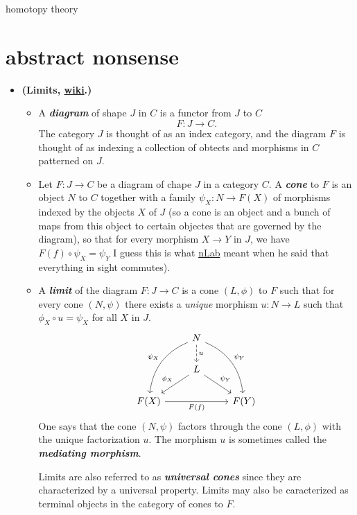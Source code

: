 \documentclass{article}
\begin{document}
{\Huge homotopy theory}
\tableofcontents
\section{abstract nonsense}
\begin{defn}\leavevmode
	\begin{itemize}
		\item \textbf{(Limits, \href{https://en.wikipedia.org/wiki/Limit_(category_theory)}{wiki}.)}
		\begin{itemize}
			\item A \textbf{\textit{diagram}} of shape $J$ in $C$ is a functor from $J$ to $C$
			\[F:J\to C.\]
			The category $J$ is thought of as an index category, and the diagram $F$ is thought of as indexing a collection of obtects and morphisms in $C$ patterned on $J$.
			
			\item Let $F:J\to C$ be a diagram of chape $J$ in a category $C$. A \textbf{\textit{cone}} to $F$ is an object $N$ to $C$ together with a family $\psi_X:N\to F(X)$ of morphisms indexed by the objects $X$ of $J$ {\color{persiangreen}(so a cone is an object and a bunch of maps from this object to certain objectes that are governed by the diagram)}, so that for every morphism $X\to Y$ in $J$, we have $F(f)\circ\psi_X=\psi_Y$ {\color{persiangreen} I guess this is what \href{https://ncatlab.org/nlab/show/limit}{nLab} meant when he said that everything in sight commutes)}.
			
			\item A \textbf{\textit{limit}} of the diagram $F:J\to C$ is a cone $(L,\phi)$ to $F$ such that for every cone $(N,\psi)$ there exists a \textit{unique} morphism $u:N\to L$ such that $\phi_X\circ u=\psi_X$ for all $X$ in $J$.
			\[\begin{tikzcd}
				&N\arrow[d,"u",dashed]\arrow[rdd,bend left,"\psi_Y"]\arrow[ddl,swap,bend right,"\psi_X"]\\
				&L\arrow[dl,swap,"\phi_X"]\arrow[dr,"\psi_Y"]\\
				F(X)\arrow[rr,"F(f)",swap]&&F(Y)
			\end{tikzcd}\]
			One says that the cone $(N,\psi)$ factors through the cone $(L,\phi)$ with the unique factorization $u$. The morphism $u$ is sometimes called the \textbf{\textit{mediating morphism}}.
			
			Limits are also referred to as \textbf{\textit{universal cones}} since they are characterized by a universal property. Limits may also be caracterized as terminal objects in the category of cones to $F$.
			

\end{itemize}
\end{itemize}
\end{defn}
\end{document}
